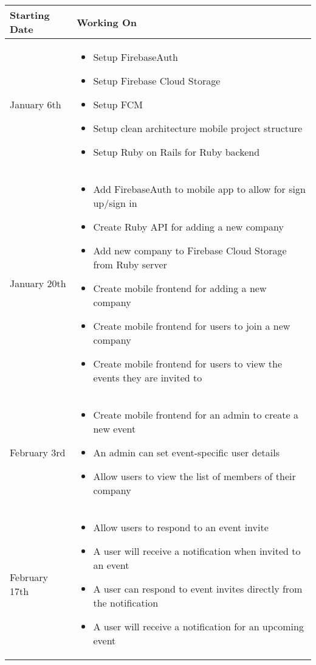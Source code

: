 \begin{longtable}{ |p{4cm}|p{10cm}|  }
		\hline
		\hline
		\textbf{Starting Date} & \textbf{Working On} \\
		\hline
		January 6th & 
		\begin{itemize}
		    \item Setup FirebaseAuth
		    \item Setup Firebase Cloud Storage
		    \item Setup FCM
		    \item Setup clean architecture mobile project structure
		    \item Setup Ruby on Rails for Ruby backend
		\end{itemize}\\
		\hline
		January 20th & 
		\begin{itemize}
		    \item Add FirebaseAuth to mobile app to allow for sign up/sign in
		    \item Create Ruby API for adding a new company
		    \item Add new company to Firebase Cloud Storage from Ruby server
		    \item Create mobile frontend for adding a new company
		    \item Create mobile frontend for users to join a new company
		    \item Create mobile frontend for users to view the events they are invited to
		\end{itemize}\\
		\hline
		February 3rd & 
		\begin{itemize}
		    \item Create mobile frontend for an admin to create a new event
		    \item An admin can set event-specific user details
		    \item Allow users to view the list of members of their company
		\end{itemize}\\
		\hline
		February 17th & 
		\begin{itemize}
		    \item Allow users to respond to an event invite
		    \item A user will receive a notification when invited to an event
		    \item A user can respond to event invites directly from the notification
		    \item A user will receive a notification for an upcoming event

\end{itemize}
\end{longtable}
